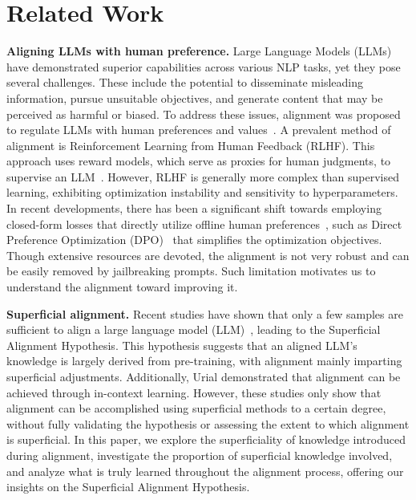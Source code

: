 \section{Related Work}

\textbf{Aligning LLMs with human preference.}
Large Language Models (LLMs) have demonstrated superior capabilities across various NLP tasks, yet they pose several challenges. These include the potential to disseminate misleading information, pursue unsuitable objectives, and generate content that may be perceived as harmful or biased\cite{mozes2023use, chang2024survey}. To address these issues, alignment was proposed to regulate LLMs with human preferences and values~\cite{rlhf, dpo, spin}. A prevalent method of alignment is Reinforcement Learning from Human Feedback (RLHF). This approach uses reward models, which serve as proxies for human judgments, to supervise an LLM~\cite{macglashan2017interactive, xue2023reinforcement, yuan2023rrhf, zhu2023principled}. However, RLHF is generally more complex than supervised learning, exhibiting optimization instability and sensitivity to hyperparameters. In recent developments, there has been a significant shift towards employing closed-form losses that directly utilize offline human preferences~\cite{song2024preference, ethayarajh2024kto}, such as Direct Preference Optimization (DPO)~\cite{dpo} that simplifies the optimization objectives.
Though extensive resources are devoted, the alignment is not very robust and can be easily removed by jailbreaking prompts.
Such limitation motivates us to understand the alignment toward improving it.



\textbf{Superficial alignment.}
Recent studies have shown that only a few samples are sufficient to align a large language model (LLM)~\cite{lima, chen2023alpagasus, lee2023platypus}, leading to the Superficial Alignment Hypothesis. This hypothesis suggests that an aligned LLM's knowledge is largely derived from pre-training, with alignment mainly imparting superficial adjustments. Additionally, Urial\cite{urial} demonstrated that alignment can be achieved through in-context learning. However, these studies only show that alignment can be accomplished using superficial methods to a certain degree, without fully validating the hypothesis or assessing the extent to which alignment is superficial. In this paper, we explore the superficiality of knowledge introduced during alignment, investigate the proportion of superficial knowledge involved, and analyze what is truly learned throughout the alignment process, offering our insights on the Superficial Alignment Hypothesis.


